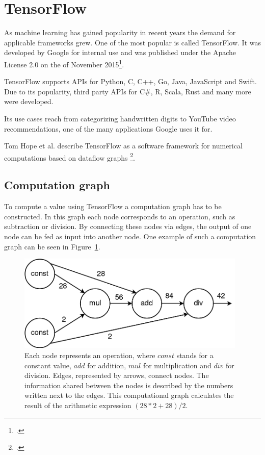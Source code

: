 \newpage

\section{TensorFlow}
As machine learning has gained popularity in recent years the demand for applicable frameworks grew. One of the most popular is called TensorFlow. It was developed by Google for internal use and was published under the Apache License 2.0 on the  of November 2015\footcite{Wikipedia_TensorFlow}.

TensorFlow supports APIs for Python, C, C++, Go, Java, JavaScript and Swift.
Due to its popularity, third party APIs for C\#, R, Scala, Rust and many more were developed.

Its use cases reach from categorizing handwritten digits to YouTube video recommendations, one of the many applications Google uses it for.

Tom Hope et al. describe TensorFlow as a software framework for numerical computations based on dataflow graphs \footcite[page 6]{Hope_Learning_TensorFlow}.

\subsection{Computation graph}
To compute a value using TensorFlow a computation graph has to be constructed. In this graph each node corresponds to an operation, such as subtraction or division. By connecting these nodes via edges, the output of one node can be fed as input into another node. One example of such a computation graph can be seen in Figure~\ref{pic:methodology_tensorflow_computationGraph}.

\begin{figure}[h!]
	\centering
	\includegraphics[width=4.3in]{img/methodology_tensorflow_computationGraph.png}
	\caption{Each node represents an operation, where $const$ stands for a constant value, $add$ for addition, $mul$ for multiplication and $div$ for division. Edges, represented by arrows, connect nodes. The information shared between the nodes is described by the numbers written next to the edges. This computational graph calculates the result of the arithmetic expression $(28 * 2 + 28) / 2$.}
	\label{pic:methodology_tensorflow_computationGraph}
\end{figure}


